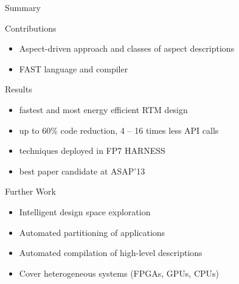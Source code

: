 \begin{frame}{Summary}
  \begin{beamerboxesrounded}{Contributions}
    \begin{itemize}
    \item  Aspect-driven approach and classes of aspect descriptions
    \item  FAST language and compiler
    \end{itemize}
  \end{beamerboxesrounded}
  \vspace{0.3cm}
  \begin{beamerboxesrounded}{Results}
    \begin{itemize}
    \item fastest and most energy efficient RTM design
    \item up to 60\% code reduction, 4 -- 16 times less API calls
    \item techniques deployed in FP7 HARNESS
    \item best paper candidate at ASAP'13
    \end{itemize}
  \end{beamerboxesrounded}
  \vspace{0.3cm}

  \begin{beamerboxesrounded}{Further Work}
    \begin{itemize}
    \item Intelligent design space exploration
    \item Automated partitioning of applications
    \item Automated compilation of high-level descriptions
    \item Cover heterogeneous systems (FPGAs, GPUs, CPUs)
    \end{itemize}
  \end{beamerboxesrounded}
\end{frame}

